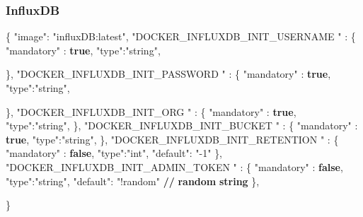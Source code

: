 \documentclass[
  11pt,
]{article}
\newenvironment{Shaded}{}{}
\newcommand{\DataTypeTok}[1]{\textcolor[rgb]{0.56,0.13,0.00}{#1}}
\newcommand{\ErrorTok}[1]{\textcolor[rgb]{1.00,0.00,0.00}{\textbf{#1}}}
\newcommand{\FunctionTok}[1]{\textcolor[rgb]{0.02,0.16,0.49}{#1}}
\newcommand{\KeywordTok}[1]{\textcolor[rgb]{0.00,0.44,0.13}{\textbf{#1}}}
\newcommand{\StringTok}[1]{\textcolor[rgb]{0.25,0.44,0.63}{#1}}
\begin{document}
\hypertarget{influxdb}{%
\subsubsection{InfluxDB}\label{influxdb}}

\begin{Shaded}
\begin{Highlighting}[]
\FunctionTok{\{}
  \DataTypeTok{"image"}\FunctionTok{:} \StringTok{"influxDB:latest"}\FunctionTok{,}
  \DataTypeTok{"DOCKER\_INFLUXDB\_INIT\_USERNAME "} \FunctionTok{:} \FunctionTok{\{}
    \DataTypeTok{"mandatory"} \FunctionTok{:} \KeywordTok{true}\FunctionTok{,}
    \DataTypeTok{"type"}\FunctionTok{:}\StringTok{"string"}\FunctionTok{,}
    
  \FunctionTok{\},}
  \DataTypeTok{"DOCKER\_INFLUXDB\_INIT\_PASSWORD "} \FunctionTok{:} \FunctionTok{\{}
    \DataTypeTok{"mandatory"} \FunctionTok{:} \KeywordTok{true}\FunctionTok{,}
    \DataTypeTok{"type"}\FunctionTok{:}\StringTok{"string"}\FunctionTok{,}
    
  \FunctionTok{\},}
  \DataTypeTok{"DOCKER\_INFLUXDB\_INIT\_ORG "} \FunctionTok{:} \FunctionTok{\{}
    \DataTypeTok{"mandatory"} \FunctionTok{:} \KeywordTok{true}\FunctionTok{,}
    \DataTypeTok{"type"}\FunctionTok{:}\StringTok{"string"}\FunctionTok{,}
  \FunctionTok{\},}
  \DataTypeTok{"DOCKER\_INFLUXDB\_INIT\_BUCKET "} \FunctionTok{:} \FunctionTok{\{}
    \DataTypeTok{"mandatory"} \FunctionTok{:} \KeywordTok{true}\FunctionTok{,}
    \DataTypeTok{"type"}\FunctionTok{:}\StringTok{"string"}\FunctionTok{,}
  \FunctionTok{\},}
   \DataTypeTok{"DOCKER\_INFLUXDB\_INIT\_RETENTION "} \FunctionTok{:} \FunctionTok{\{}
    \DataTypeTok{"mandatory"} \FunctionTok{:} \KeywordTok{false}\FunctionTok{,}
    \DataTypeTok{"type"}\FunctionTok{:}\StringTok{"int"}\FunctionTok{,}
    \DataTypeTok{"default"}\FunctionTok{:} \StringTok{"{-}1"}
  \FunctionTok{\},}
   \DataTypeTok{"DOCKER\_INFLUXDB\_INIT\_ADMIN\_TOKEN "} \FunctionTok{:} \FunctionTok{\{}
    \DataTypeTok{"mandatory"} \FunctionTok{:} \KeywordTok{false}\FunctionTok{,}
    \DataTypeTok{"type"}\FunctionTok{:}\StringTok{"string"}\FunctionTok{,}
    \DataTypeTok{"default"}\FunctionTok{:} \StringTok{"!random"} \ErrorTok{//} \ErrorTok{random} \ErrorTok{string}
  \FunctionTok{\},}
  
\FunctionTok{\}}
\end{Highlighting}
\end{Shaded}
\end{document}
